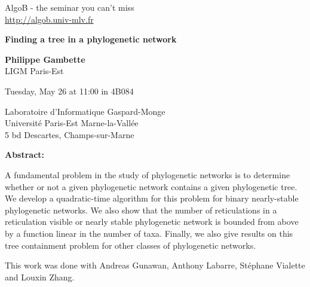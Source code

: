 \documentclass[a4paper,12pt]{report}
\newcommand{\algob}{
	\begin{center}
	\large
	AlgoB - the seminar you can't miss\\
	{\url{http://algob.univ-mlv.fr}}
	\end{center}
	\medskip
}
\renewcommand{\title}[1]{
	\begin{center}
	{\textbf{\huge #1}}
	\end{center}
}
\newcommand{\speaker}[2]{
	\begin{center}
	{\textbf{\Large #1}}\\
	{#2}
	\end{center}
}
\renewcommand{\date}[1]{
	\begin{center}
	{\large #1}
	\end{center}
}
\newcommand{\place}[1]{
	\begin{center}
	{#1}
	\end{center}
}
\renewcommand{\abstract}[1]{
	\bigskip
	{
	\textbf{Abstract:}
	#1
	}
}
\begin{document}
\algob

\title{Finding a tree in a phylogenetic network}

\speaker{Philippe Gambette}{LIGM Paris-Est}

\date{Tuesday, May 26 at 11:00 in 4B084}
\place{Laboratoire d'Informatique Gaspard-Monge\\Université Paris-Est Marne-la-Vallée\\5 bd Descartes, Champs-sur-Marne}

\abstract{
A fundamental problem in the study of phylogenetic networks is to determine whether or not a given phylogenetic network contains a given phylogenetic tree. We develop a quadratic-time algorithm for this problem for binary nearly-stable phylogenetic networks. We also show that the number of reticulations in a reticulation visible or nearly stable phylogenetic network is bounded from above by a function linear in the number of taxa. Finally, we also give results on this tree containment problem for other classes of phylogenetic networks.

This work was done with Andreas Gunawan, Anthony Labarre, Stéphane Vialette and Louxin Zhang.
}
\end{document}
